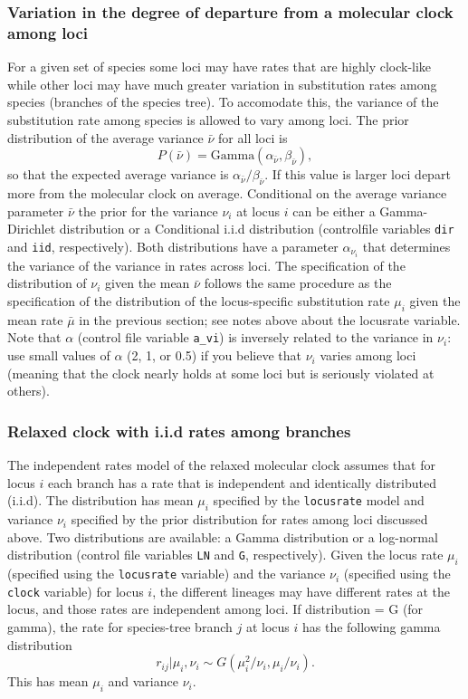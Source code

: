 \documentclass[a4paper]{book}
\numberwithin{equation}{section} \renewcommand{\baselinestretch}{0.55}
\begin{document}
\subsubsection{Variation in the degree of departure from a molecular clock among loci}
For a given set of species some loci may have rates that are highly
clock-like while other loci may have much greater variation in
substitution rates among species (branches of the species tree). To
accomodate this, the variance of the substitution rate among species
is allowed to vary among loci. The prior distribution of the average
variance $\bar{\nu}$ for all loci is
\begin{displaymath}
  P(\bar{\nu}) = \textrm{Gamma}(\alpha_{\bar{\nu}},\beta_{\bar{\nu}}),
\end{displaymath}
so that the expected average variance is
$\alpha_{\bar{\nu}}/\beta_{\bar{\nu}}$.  If this value is larger loci
depart more from the molecular clock on average.  Conditional on the
average variance parameter $\bar{\nu}$ the prior for the variance
$\nu_i$ at locus $i$ can be either a Gamma-Dirichlet distribution or a
Conditional i.i.d distribution (controlfile variables \texttt{dir} and
\texttt{iid}, respectively).  Both distributions have a parameter
$\alpha_{\nu_i}$ that determines the variance of the variance in rates
across loci.  The specification of the distribution of $\nu_i$ given
the mean $\bar\nu$ follows the same procedure as the specification of
the distribution of the locus-specific substitution rate $\mu_i$ given
the mean rate $\bar\mu$ in the previous section; see notes above about
the locusrate variable.  Note that $\alpha$ (control file variable
\texttt{a\_vi}) is inversely related to the variance in $\nu_i$: use
small values of $\alpha$ (2, 1, or 0.5) if you believe that $\nu_i$
varies among loci (meaning that the clock nearly holds at some loci
but is seriously violated at others).

\subsubsection{Relaxed clock with i.i.d rates among branches}
The independent rates model of the relaxed molecular clock assumes
that for locus $i$ each branch has a rate that is independent and
identically distributed (i.i.d). The distribution has mean $\mu_i$
specified by the \texttt{locusrate} model and variance $\nu_i$
specified by the prior distribution for rates among loci discussed
above.  Two distributions are available: a Gamma distribution or a
log-normal distribution (control file variables \texttt{LN} and
\texttt{G}, respectively).  Given the locus rate $\mu_i$ (specified
using the \texttt{locusrate} variable) and the variance $\nu_i$
(specified using the \texttt{clock} variable) for locus $i$, the
different lineages may have different rates at the locus, and those
rates are independent among loci.  If distribution = G (for gamma),
the rate for species-tree branch $j$ at locus $i$ has the following
gamma distribution
\begin{equation}
  r_{ij} | \mu_i, \nu_i \sim G(\mu_i^2/\nu_i, \mu_i/\nu_i).
\end{equation}
This has mean $\mu_i$ and variance $\nu_i$.
\end{document}
